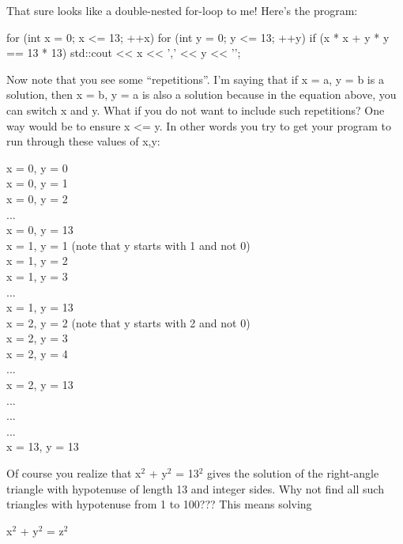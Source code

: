 \begin{console}
That sure looks like a double-nested for-loop to me!
Here's the program:
\begin{console}
for (int x = 0; x <= 13; ++x)
{   
    for (int y = 0; y <= 13; ++y)
    {
        if (x * x + y * y == 13 * 13)
        {  
           std::cout << x << ',' << y << '\n';
        }
    }
}
\end{console}
Now note that you see some ``repetitions''. I'm saying
that if x = a, y = b is a solution, then x = b, y = a is also a solution
because in the equation above, you can switch x and y. What if you do
not want to include such repetitions? One way would be to ensure x
<= y. In other words you try to get your program to run through
these values of x,y:

x = 0, y = 0\\
x = 0, y = 1\\
x = 0, y = 2\\
...\\
x = 0, y = 13\\
x = 1, y = 1 (note that y starts with 1 and not 0)\\
x = 1, y = 2\\
x = 1, y = 3\\
...\\
x = 1, y = 13\\
x = 2, y = 2 (note that y starts with 2 and not 0)\\
x = 2, y = 3\\
x = 2, y = 4\\
...\\
x = 2, y = 13\\
...\\
...\\
...\\
x = 13, y = 13\\
Of course you realize that x$^2$ + y$^2$ = 13$^2$ gives the solution of the right-angle triangle with hypotenuse of length 13 and integer sides. Why not find all such triangles with hypotenuse from 1 to 100??? This means solving

\begin{center}
x$^2$ + y$^2$ = z$^2$
\end{center}


\end{console}
